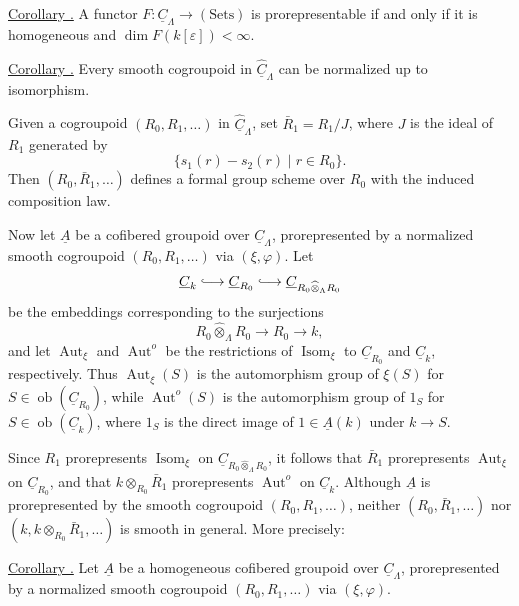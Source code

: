 
\underline{Corollary .} A functor
$F:\underline C_\Lambda\longrightarrow(\mathrm{Sets})$ is
prorepresentable if and only if it is homogeneous and
$\dim F(k[\varepsilon])<\infty$.

\underline{Corollary .} Every smooth cogroupoid in
$\widehat{\underline C}_\Lambda$ can be normalized up to isomorphism.

Given a cogroupoid $(R_0,R_1,\ldots)$ in
$\widehat{\underline C}_\Lambda$, set $\bar R_1=R_1/J$, where $J$ is
the ideal of $R_1$ generated by
\[
 \{s_1(r)-s_2(r)\mid r\in R_0\}.
\]
Then $(R_0,\bar R_1,\ldots)$ defines a formal group scheme over $R_0$
with the induced composition law.

Now let $\underline A$ be a cofibered groupoid over
$\underline C_\Lambda$, prorepresented by a normalized smooth
cogroupoid $(R_0,R_1,\ldots)$ via $(\xi,\varphi)$. Let
\[
 \underline C_k\lhook\joinrel\longrightarrow
 \underline C_{R_0}\lhook\joinrel\longrightarrow
 \underline C_{R_0\widehat\otimes_\Lambda R_0}
\]
be the embeddings corresponding to the surjections
\[
 R_0\widehat\otimes_\Lambda R_0\longrightarrow R_0\longrightarrow k,
\]
and let $\operatorname{Aut}_\xi$ and $\operatorname{Aut}^{o}$ be the
restrictions of $\operatorname{Isom}_\xi$ to
$\underline C_{R_0}$ and $\underline C_k$, respectively. Thus
$\operatorname{Aut}_\xi(S)$ is the automorphism group of $\xi(S)$ for
$S\in\operatorname{ob}(\underline C_{R_0})$, while
$\operatorname{Aut}^{o}(S)$ is the automorphism group of $1_S$ for
$S\in\operatorname{ob}(\underline C_k)$, where $1_S$ is the direct
image of $1\in\underline A(k)$ under $k\longrightarrow S$.

Since $R_1$ prorepresents $\operatorname{Isom}_\xi$ on
$\underline C_{R_0\widehat\otimes_\Lambda R_0}$, it follows that
$\bar R_1$ prorepresents $\operatorname{Aut}_\xi$ on
$\underline C_{R_0}$, and that
$k\otimes_{R_0}\bar R_1$ prorepresents $\operatorname{Aut}^{o}$ on
$\underline C_k$. Although $\underline A$ is prorepresented by the
smooth cogroupoid $(R_0,R_1,\ldots)$, neither
$(R_0,\bar R_1,\ldots)$ nor
$(k,k\otimes_{R_0}\bar R_1,\ldots)$ is smooth in general. More
precisely:

\underline{Corollary .} Let $\underline A$ be a homogeneous
cofibered groupoid over $\underline C_\Lambda$, prorepresented by a
normalized smooth cogroupoid $(R_0,R_1,\ldots)$ via
$(\xi,\varphi)$.

